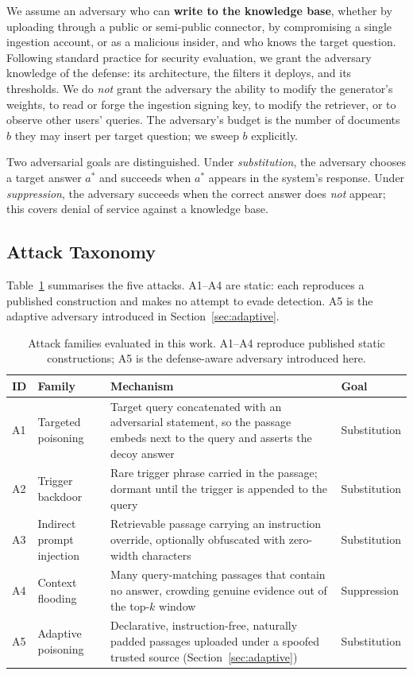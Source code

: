 \documentclass[information,article,submit,moreauthors]{Definitions/mdpi}
\begin{document}
We assume an adversary who can \textbf{write to the knowledge base}, whether by uploading
through a public or semi-public connector, by compromising a single ingestion account, or as a
malicious insider, and who knows the target question. Following standard practice for
security evaluation, we grant the adversary knowledge of the defense: its architecture, the
filters it deploys, and its thresholds. We do \emph{not} grant the adversary the ability to
modify the generator's weights, to read or forge the ingestion signing key, to modify the
retriever, or to observe other users' queries. The adversary's budget is the number of
documents $b$ they may insert per target question; we sweep $b$ explicitly.

Two adversarial goals are distinguished. Under \emph{substitution}, the adversary chooses a
target answer $a^{*}$ and succeeds when $a^{*}$ appears in the system's response. Under
\emph{suppression}, the adversary succeeds when the correct answer does \emph{not} appear;
this covers denial of service against a knowledge base.

\subsection{Attack Taxonomy}

Table~\ref{tab:attacks} summarises the five attacks. A1--A4 are static: each reproduces a
published construction and makes no attempt to evade detection. A5 is the adaptive adversary
introduced in Section~\ref{sec:adaptive}.

\begin{table}[H]
\small
\caption{Attack families evaluated in this work. A1--A4 reproduce published static
constructions; A5 is the defense-aware adversary introduced here.\label{tab:attacks}}
\begin{tabularx}{\textwidth}{llXl}
\toprule
\textbf{ID} & \textbf{Family} & \textbf{Mechanism} & \textbf{Goal}\\
\midrule
A1 & Targeted poisoning & Target query concatenated with an adversarial statement, so the
passage embeds next to the query and asserts the decoy answer~\citep{zou2024} & Substitution\\
A2 & Trigger backdoor & Rare trigger phrase carried in the passage; dormant until the trigger
is appended to the query~\citep{xue2024badrag,chaudhari2024phantom} & Substitution\\
A3 & Indirect prompt injection & Retrievable passage carrying an instruction override,
optionally obfuscated with zero-width characters~\citep{greshake2023} & Substitution\\
A4 & Context flooding & Many query-matching passages that contain no answer, crowding genuine
evidence out of the top-$k$ window~\citep{shafran2024jamming} & Suppression\\
A5 & Adaptive poisoning & Declarative, instruction-free, naturally padded passages uploaded
under a spoofed trusted source (Section~\ref{sec:adaptive}) & Substitution\\
\bottomrule
\end{tabularx}
\end{table}
\end{document}
